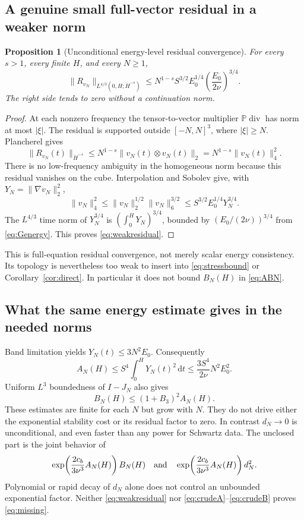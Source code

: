 \documentclass[11pt,a4paper]{article}
\newtheorem{proposition}[theorem]{Proposition}
\theoremstyle{definition}\newtheorem{definition}[theorem]{Definition}
\theoremstyle{remark}\newtheorem{remark}[theorem]{Remark}
\newcommand{\PP}{\mathbb P}
\newcommand{\dd}{\,\mathrm d}
\newcommand{\norm}[1]{\lVert #1\rVert}
\newcommand{\diver}{\operatorname{div}}
\newcommand{\cb}{c_b}
\numberwithin{equation}{section}
\begin{document}
\subsection{A genuine small full-vector residual in a weaker norm}
\begin{proposition}[Unconditional energy-level residual convergence]\label{prop:weakresidual}
For every $s>1$, every finite $H$, and every $N\ge1$,
\begin{equation}\label{eq:weakresidual}
 \norm{R_{v_N}}_{L^{4/3}(0,H;\dot H^{-s})}
 \le N^{1-s}S^{3/2}E_0^{1/4}
       \left(\frac{E_0}{2\nu}\right)^{3/4}.
\end{equation}
The right side tends to zero without a continuation norm.
\end{proposition}
\begin{proof}
At each nonzero frequency the tensor-to-vector multiplier $\PP\diver$ has norm at most $|\xi|$. The residual is supported outside $[-N,N]^3$, where $|\xi|\ge N$. Plancherel gives
\[
 \norm{R_{v_N}(t)}_{\dot H^{-s}}
 \le N^{1-s}\norm{v_N(t)\otimes v_N(t)}_2
 =N^{1-s}\norm{v_N(t)}_4^2.
\]
There is no low-frequency ambiguity in the homogeneous norm because this residual vanishes on the cube. Interpolation and Sobolev give, with $Y_N=\norm{\nabla v_N}_2^2$,
\[
 \norm{v_N}_4^2\le\norm{v_N}_2^{1/2}\norm{v_N}_6^{3/2}
 \le S^{3/2}E_0^{1/4}Y_N^{3/4}.
\]
The $L^{4/3}$ time norm of $Y_N^{3/4}$ is $(\int_0^H Y_N)^{3/4}$, bounded by $(E_0/(2\nu))^{3/4}$ from \eqref{eq:Genergy}. This proves \eqref{eq:weakresidual}.
\end{proof}

This is full-equation residual convergence, not merely scalar energy consistency. Its topology is nevertheless too weak to insert into \eqref{eq:stressbound} or Corollary~\ref{cor:direct}. In particular it does not bound $B_N(H)$ in \eqref{eq:ABN}.

\subsection{What the same energy estimate gives in the needed norms}
Band limitation yields $Y_N(t)\le3N^2E_0$. Consequently
\begin{equation}\label{eq:crudeA}
 A_N(H)\le S^4\int_0^H Y_N(t)^2\dd t
 \le\frac{3S^4}{2\nu}N^2E_0^2.
\end{equation}
Uniform $L^3$ boundedness of $I-J_N$ also gives
\begin{equation}\label{eq:crudeB}
 B_N(H)\le(1+B_3)^2A_N(H).
\end{equation}
These estimates are finite for each $N$ but grow with $N$. They do not drive either the exponential stability cost or its residual factor to zero. In contrast $d_N\to0$ is unconditional, and even faster than any power for Schwartz data. The unclosed part is the joint behavior of
\begin{equation}\label{eq:missingpair}
 \exp\!\left(\frac{2\cb}{3\nu^3}A_N(H)\right)B_N(H)
 \quad\hbox{and}\quad
 \exp\!\left(\frac{2\cb}{3\nu^3}A_N(H)\right)d_N^2.
\end{equation}
Polynomial or rapid decay of $d_N$ alone does not control an unbounded exponential factor. Neither \eqref{eq:weakresidual} nor \eqref{eq:crudeA}--\eqref{eq:crudeB} proves \eqref{eq:missing}.
\end{document}
